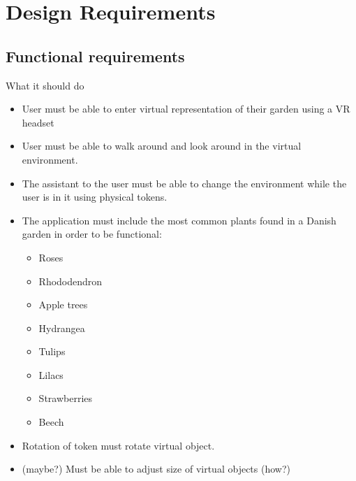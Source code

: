 			\section{Design Requirements}
			
				\subsection{Functional requirements}
					What it should do\\
					\begin{itemize}
						\item User must be able to enter virtual representation of their garden using a VR headset
						\item User must be able to walk around and look around in the virtual environment.
						\item The assistant to the user must be able to change the environment while the user is in it using physical tokens.
						\item The application must include the most common plants found in a Danish garden in order to be functional:
						\begin{itemize}
							\item Roses
							\item Rhododendron
							\item Apple trees
							\item Hydrangea
							\item Tulips
							\item Lilacs
							\item Strawberries
							\item Beech
						\end{itemize}
						\item Rotation of token must rotate virtual object.
						\item (maybe?) Must be able to adjust size of virtual objects (how?)
					\end{itemize}
					
